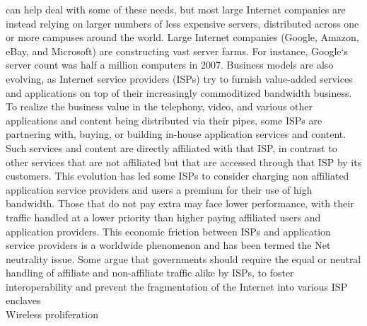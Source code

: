 \documentclass[11pt,a4paper]{article}
\begin{document}
can help deal with some of these needs, but most large Internet companies are instead relying on larger numbers of less expensive servers, distributed across
one or more campuses around the world. Large Internet companies (Google, Amazon, eBay, and Microsoft) are constructing vast server farms. For instance, Google‘s
server count was half a million computers in 2007. Business models are also evolving, as Internet service providers (ISPs) try to furnish value-added
services and applications on top of their increasingly commoditized bandwidth business. To realize the business value in the telephony, video, and various
other applications and content being distributed via their pipes, some ISPs are partnering with, buying, or building in-house application services and content.
Such services and content are directly affiliated with that ISP, in contrast to other services that are not affiliated but that are accessed through that ISP by its customers. This evolution has led some ISPs to consider
charging non affiliated application service providers and users a premium for their use of high bandwidth. Those that do not pay extra may face lower
performance, with their traffic handled at a lower priority than higher paying affiliated users and
application providers. This economic friction between ISPs and
application service providers is a worldwide
phenomenon and has been termed the Net neutrality issue. Some argue that governments should require the equal or neutral handling of affiliate and non-affiliate traffic alike by ISPs, to foster interoperability and prevent the fragmentation of the Internet into various ISP enclaves\\

Wireless proliferation \\
\end{document}
